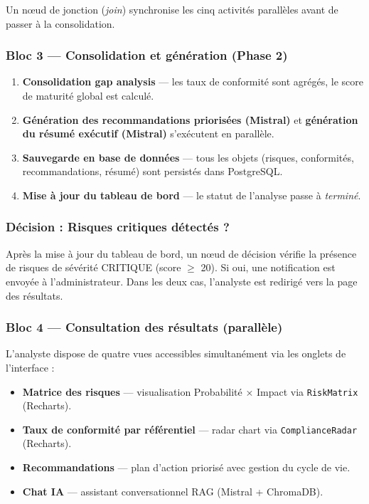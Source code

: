 Un nœud de jonction (\textit{join}) synchronise les cinq activités
parallèles avant de passer à la consolidation.

\subsubsection*{Bloc 3 — Consolidation et génération (Phase 2)}

\begin{enumerate}
  \item \textbf{Consolidation gap analysis} — les taux de conformité
    sont agrégés, le score de maturité global est calculé.
  \item \textbf{Génération des recommandations priorisées (Mistral)} et
    \textbf{génération du résumé exécutif (Mistral)} s'exécutent en
    parallèle.
  \item \textbf{Sauvegarde en base de données} — tous les objets (risques,
    conformités, recommandations, résumé) sont persistés dans PostgreSQL.
  \item \textbf{Mise à jour du tableau de bord} — le statut de l'analyse
    passe à \textit{terminé}.
\end{enumerate}

\subsubsection*{Décision : Risques critiques détectés ?}

Après la mise à jour du tableau de bord, un nœud de décision vérifie
la présence de risques de sévérité CRITIQUE (score $\geq$ 20). Si oui,
une notification est envoyée à l'administrateur. Dans les deux cas,
l'analyste est redirigé vers la page des résultats.

\subsubsection*{Bloc 4 — Consultation des résultats (parallèle)}

L'analyste dispose de quatre vues accessibles simultanément via les
onglets de l'interface :
\begin{itemize}
  \item \textbf{Matrice des risques} — visualisation Probabilité × Impact
    via \texttt{RiskMatrix} (Recharts).
  \item \textbf{Taux de conformité par référentiel} — radar chart
    via \texttt{ComplianceRadar} (Recharts).
  \item \textbf{Recommandations} — plan d'action priorisé avec gestion
    du cycle de vie.
  \item \textbf{Chat IA} — assistant conversationnel RAG (Mistral +
    ChromaDB).
\end{itemize}


